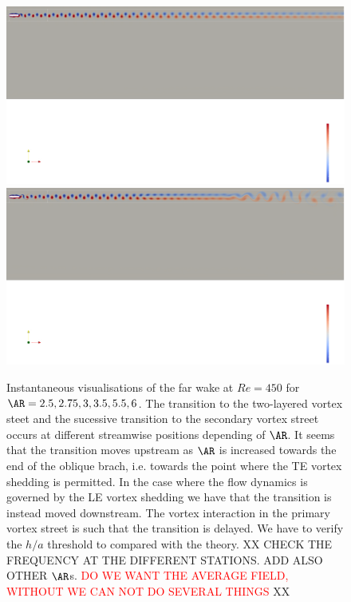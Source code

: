 \begin{figure}
  \includegraphics[trim={0 1060 0 0},clip,width=\textwidth]{./fig/appendix/AR5p5_Re450.png}
  \includegraphics[trim={0 1060 0 0},clip,width=\textwidth]{./fig/appendix/AR6_Re450.png}        
  \caption{Instantaneous visualisations of the far wake at $Re=450$ for $\AR=2.5, 2.75, 3, 3.5, 5.5, 6$. The transition to the two-layered vortex steet and the sucessive transition to the secondary vortex street occurs at different streamwise positions depending of $\AR$. It seems that the transition moves upstream as $\AR$ is increased towards the end of the oblique brach, i.e. towards the point where the TE vortex shedding is permitted. In the case where the flow dynamics is governed by the LE vortex shedding we have that the transition is instead moved downstream. The vortex interaction in the primary vortex street is such that the transition is delayed. We have to verify the $h/a$ threshold to compared with the theory. XX CHECK THE FREQUENCY AT THE DIFFERENT STATIONS. ADD ALSO OTHER $\AR$s. \textcolor{red}{DO WE WANT THE AVERAGE FIELD, WITHOUT WE CAN NOT DO SEVERAL THINGS} XX}
  \label{fig:wake}
\end{figure}

